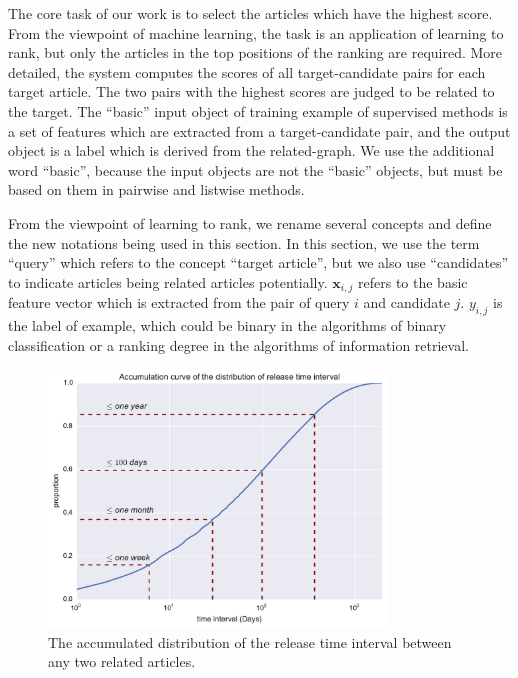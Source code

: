 The core task of our work is to select the articles which have the highest score. From the viewpoint of machine learning, the task is an application of learning to rank, but only the articles in the top positions of the ranking are required. More detailed, the system computes the scores of all target-candidate pairs for each target article. The two pairs with the highest scores are judged to be related to the target. The ``basic'' input object of training example of supervised methods is a set of features which are extracted from a target-candidate pair, and the output object is a label which is derived from the related-graph. We use the additional word ``basic'', because the input objects are not the ``basic'' objects, but must be based on them in pairwise and listwise methods. 

From the viewpoint of learning to rank, we rename several concepts and define the new notations being used in this section. In this section, we use the term ``query'' which refers to the concept ``target article'', but we also use ``candidates'' to indicate articles being related articles potentially. $\mathbf{x}_{i, j}$ refers to the basic feature vector which is extracted from the pair of query $i$ and candidate $j$. $y_{i,j}$ is the label of example, which could be binary in the algorithms of binary classification or a ranking degree in the algorithms of information retrieval. 

\begin{figure}[!htb]
    \centering
    \includegraphics[width=0.8\textwidth]{fig/release_related}
    \caption{The accumulated distribution of the release time interval between any two related articles. }
    \label{fig:release_relate}
\end{figure}

